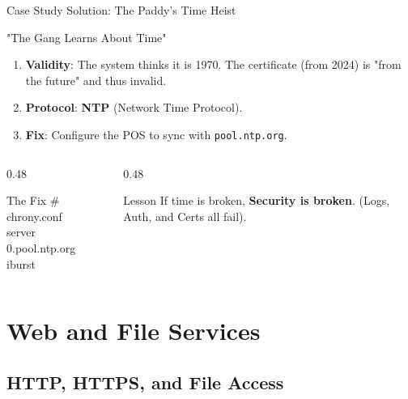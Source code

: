 \documentclass[aspectratio=169]{beamer}  %
\begin{document}
\begin{frame}{Case Study Solution: The Paddy's Time Heist}
    \begin{casesolution}{"The Gang Learns About Time"}
        \small
        \begin{enumerate}
            \item \textbf{Validity}: The system thinks it is 1970. The certificate (from 2024) is "from the future" and thus invalid.
            \item \textbf{Protocol}: \textbf{NTP} (Network Time Protocol).
            \item \textbf{Fix}: Configure the POS to sync with \texttt{pool.ntp.org}.
        \end{enumerate}
    \end{casesolution}
    
    \begin{columns}[T]
        \begin{column}{0.48\textwidth}
            \begin{block}{The Fix}
                \ttfamily\small
                \# chrony.conf\\
                server 0.pool.ntp.org iburst
            \end{block}
        \end{column}
        \begin{column}{0.48\textwidth}
            \begin{alertblock}{Lesson}
                \small
                If time is broken, \textbf{Security is broken}. (Logs, Auth, and Certs all fail).
            \end{alertblock}
        \end{column}
    \end{columns}
\end{frame}

\section{Web and File Services}
\subsection{HTTP, HTTPS, and File Access}

\end{document}
